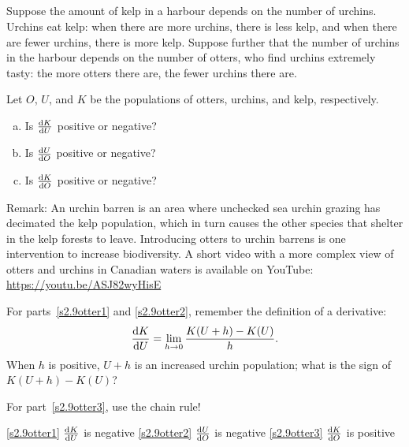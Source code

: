 %
%

\subsection*{\Conceptual}

\begin{Mquestion}
Suppose the amount of kelp in a harbour depends on the number of urchins. Urchins eat kelp: when there are more urchins, there is less kelp, and when there are fewer urchins, there is more kelp. Suppose further that the number of urchins in the harbour depends on the number of otters, who find urchins extremely tasty: the more otters there are, the fewer urchins there are.

Let $O$, $U$, and $K$ be the populations of otters, urchins, and kelp, respectively.
\begin{enumerate}[(a)]
\item\label{s2.9otter1} Is $\diff{K}{U}$ positive or negative?
\item\label{s2.9otter2} Is $\diff{U}{O}$ positive or negative?
\item\label{s2.9otter3} Is $\diff{K}{O}$ positive or negative?
\end{enumerate}
Remark: An urchin barren is an area where unchecked sea urchin grazing has decimated the kelp population, which in turn causes the other species that shelter in the kelp forests to leave. Introducing otters to urchin barrens is one intervention to increase biodiversity. A short video with a more complex view of otters and urchins in Canadian waters is available on YouTube: \url{https://youtu.be/ASJ82wyHisE}
\end{Mquestion}
\begin{hint}
For  parts~\eqref{s2.9otter1} and \eqref{s2.9otter2}, remember the definition of a derivative: \[\ds\diff{K}{U}=\ds\lim_{h \rightarrow 0}\dfrac{K(U+h)-K(U)}{h}.\] When $h$ is positive, $U+h$ is an increased urchin population; what is the sign of $K(U+h)-K(U)$?

For part~\eqref{s2.9otter3}, use the chain rule!
\end{hint}
\begin{answer}
\eqref{s2.9otter1} $\diff{K}{U}$ is negative\qquad
\eqref{s2.9otter2} $\diff{U}{O}$ is negative\qquad
\eqref{s2.9otter3} $\diff{K}{O}$ is positive
\end{answer}
